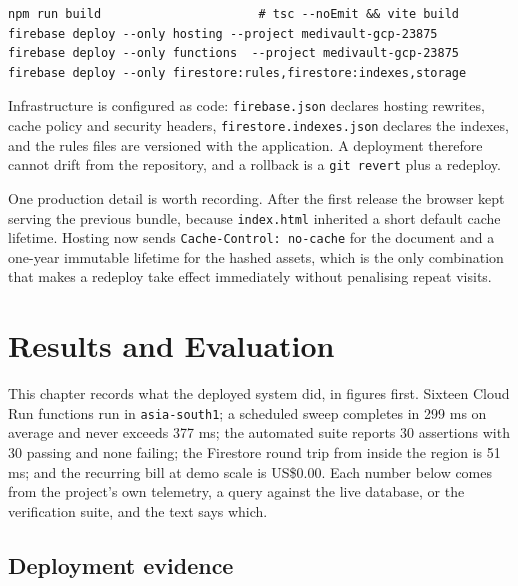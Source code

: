 \documentclass[11pt,a4paper]{report}
\begin{document}
\begin{lstlisting}[caption={Deployment commands actually used.},label={lst:deploy}]
npm run build                      # tsc --noEmit && vite build
firebase deploy --only hosting --project medivault-gcp-23875
firebase deploy --only functions  --project medivault-gcp-23875
firebase deploy --only firestore:rules,firestore:indexes,storage
\end{lstlisting}

Infrastructure is configured as code: \texttt{firebase.json} declares hosting rewrites, cache policy and
security headers, \texttt{firestore.indexes.json} declares the indexes, and the rules files are versioned
with the application. A deployment therefore cannot drift from the repository, and a rollback is a
\texttt{git revert} plus a redeploy.

One production detail is worth recording. After the first release the browser kept serving the previous
bundle, because \texttt{index.html} inherited a short default cache lifetime. Hosting now sends
\texttt{Cache-Control: no-cache} for the document and a one-year immutable lifetime for the hashed
assets, which is the only combination that makes a redeploy take effect immediately without penalising
repeat visits.

\chapter{Results and Evaluation}
\label{chap:results}

This chapter records what the deployed system did, in figures first. Sixteen Cloud Run functions run in
\texttt{asia-south1}; a scheduled sweep completes in 299 ms on average and never exceeds 377 ms; the
automated suite reports 30 assertions with 30 passing and none failing; the Firestore round trip from
inside the region is 51 ms; and the recurring bill at demo scale is US\$0.00. Each number below comes from
the project's own telemetry, a query against the live database, or the verification suite, and the text
says which.

\section{Deployment evidence}
\end{document}
